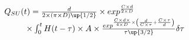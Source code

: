 \begin{equation}
\begin{array}{l}
Q_{SU}(t) = \frac{d}{2\times (\pi \times D)\up{1/2}} \times exp ^{\frac{C \times d}{2 \times D}}
\\
\ \ \ \ \ \ \ \ \times \int_0^t H(t-\tau)\times A \times \frac{ exp ^{\frac{C\times d \times}{4\times D} \times \left(\frac{d}{C \times \tau} + \frac{C \times \tau}{d} \right)}}{\tau \up{3/2}} \delta \tau
\end{array}
\end{equation}


